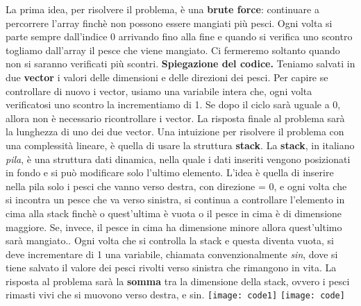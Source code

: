 
\SolNN
La prima idea, per risolvere il problema, è una \textbf{brute force}: continuare a percorrere l'array finchè non possono essere mangiati più pesci.
Ogni volta si parte sempre dall'indice 0 arrivando fino alla fine e quando si verifica uno scontro togliamo dall'array il pesce che viene mangiato.\newline
Ci fermeremo soltanto quando non si saranno verificati più scontri.
\newline\newline\newline
\textbf{Spiegazione del codice.}
\newline\newline
Teniamo salvati in due \textbf{vector} i valori delle dimensioni e delle direzioni dei pesci.
Per capire se controllare di nuovo i vector, usiamo una variabile intera che, ogni volta verificatosi uno scontro la incrementiamo di 1.
Se dopo il ciclo sarà uguale a 0, allora non è necessario ricontrollare i vector.
La risposta finale al problema sarà la lunghezza di uno dei due vector.
\newline
\SolN
Una intuizione per risolvere il problema con una complessità lineare, è quella di usare la struttura \textbf{stack}.
La \textbf{stack}, in italiano \textit{pila}, è una struttura dati dinamica, nella quale i dati inseriti vengono posizionati in fondo e si può modificare solo l'ultimo elemento.\newline\newline
L'idea è quella di inserire nella pila solo i pesci che vanno verso destra, con direzione = 0, e ogni volta che si incontra un pesce che va verso sinistra, si continua a controllare l'elemento in cima alla stack finchè o quest'ultima è vuota o il pesce in cima è di dimensione maggiore.\newline
Se, invece, il pesce in cima ha dimensione minore allora quest'ultimo sarà mangiato..
\newline\newline
Ogni volta che si controlla la stack e questa diventa vuota, si deve incrementare di 1 una variabile, chiamata convenzionalmente \textit{sin}, dove si tiene salvato il valore dei pesci rivolti verso sinistra che rimangono in vita.\newline
La risposta al problema sarà la \textbf{somma} tra la dimensione della stack, ovvero i pesci rimasti vivi che si muovono verso destra, e sin.
\newpage
\CodeNN
\texttt{[image: code1]}
\CodeN
\texttt{[image: code]}